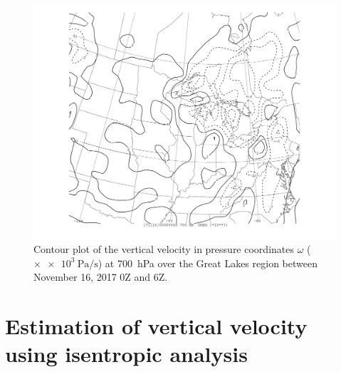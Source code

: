 \documentclass[11pt]{article}
\begin{document}
\begin{figure}[h!]
  \centering
  \includegraphics[width=\textwidth,trim={2.5cm 1cm 2.5cm 0},clip]{omeg_MI_700hPa}
  \caption{Contour plot of the vertical velocity in pressure coordinates $\omega$ ($\times \SI{e3}{\Pa\per\s}$) at \SI{700}{\hecto\Pa} over the Great Lakes region between November 16, 2017 0Z and 6Z.}
  \label{fig:hor_adv_vor_MI_850hPa}
\end{figure}

\section{Estimation of vertical velocity using isentropic analysis}
\end{document}

